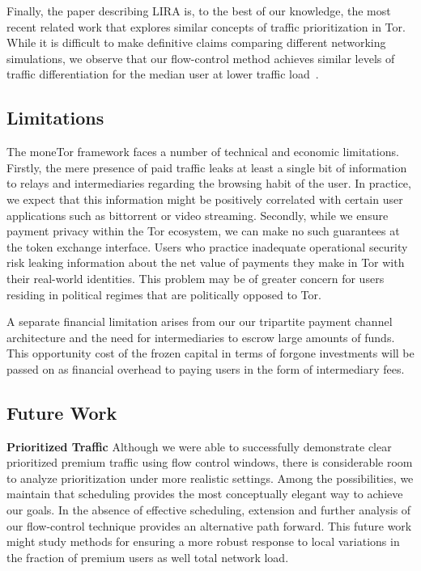 Finally, the paper describing LIRA is, to the best of our knowledge, the most
recent related work that explores similar concepts of traffic prioritization in
Tor. While it is difficult to make definitive claims comparing different
networking simulations, we observe that our flow-control method achieves similar
levels of traffic differentiation for the median user at lower traffic
load~\cite{jansen2013lira}.

\subsection{Limitations}
\label{subsec:limitations}

The moneTor framework faces a number of technical and economic
limitations. Firstly, the mere presence of paid traffic leaks at least a single
bit of information to relays and intermediaries regarding the browsing habit of
the user. In practice, we expect that this information might be positively
correlated with certain user applications such as bittorrent or video
streaming. Secondly, while we ensure payment privacy within the Tor ecosystem,
we can make no such guarantees at the token exchange interface. Users who
practice inadequate operational security risk leaking information about the net
value of payments they make in Tor with their real-world identities. This
problem may be of greater concern for users residing in political regimes that
are politically opposed to Tor.

A separate financial limitation arises from our our tripartite payment channel
architecture and the need for intermediaries to escrow large amounts of
funds. This opportunity cost of the frozen capital in terms of forgone
investments will be passed on as financial overhead to paying users in the form
of intermediary fees.

\subsection{Future Work}
\label{subsec:future_work}

\textbf{Prioritized Traffic} Although we were able to successfully demonstrate
clear prioritized premium traffic using flow control windows, there is
considerable room to analyze prioritization under more realistic settings. Among
the possibilities, we maintain that scheduling provides the most conceptually
elegant way to achieve our goals. In the absence of effective scheduling,
extension and further analysis of our flow-control technique provides an
alternative path forward. This future work might study methods for ensuring a
more robust response to local variations in the fraction of premium users as
well total network load.


